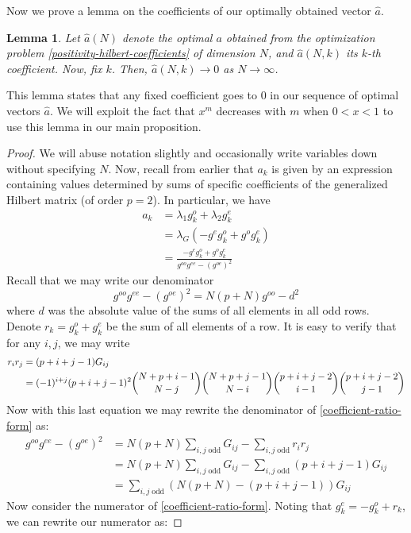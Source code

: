\documentclass{article}
\newtheorem{lem}[thm]{Lemma}
\theoremstyle{definition}
\theoremstyle{remark}
\numberwithin{equation}{section}
\begin{document}
Now we prove a lemma on the coefficients of our optimally obtained vector $\hat{a}$.
\begin{lem}\label{coefficients-vanish}
Let $\hat{a}(N)$ denote the optimal $a$ obtained from the optimization problem \ref{positivity-hilbert-coefficients} of dimension $N$, and $\hat{a}(N,k)$ its $k$-th coefficient. Now, fix $k$. Then, $\hat{a}(N,k) \to 0$ as $N\to \infty$.
\end{lem}
This lemma states that any fixed coefficient goes to 0 in our sequence of optimal vectors $\hat{a}$. We will exploit the fact that $x^m$ decreases with $m$ when $0<x<1$ to use this lemma in our main proposition. 
\begin{proof}
We will abuse notation slightly and occasionally write variables down without specifying $N$. Now, recall from earlier that $a_k$ is given by an expression containing values determined by sums of specific coefficients of the generalized Hilbert matrix (of order $p=2$). In particular, we have 
\begin{align}
a_{k} &= \lambda_1 g_k^o + \lambda_2g^e_k \\
&= \lambda_G(-g^eg_k^o + g^og_k^e) \\
&= \frac{-g^eg_k^o + g^og_k^e}{g^{oo} g^{ee}-(g^{oe})^2}\label{coefficient-ratio-form}
\end{align}
Recall that we may write our denominator
\[g^{oo} g^{ee}-(g^{oe})^2 = N(p+N)g^{oo} - d^2 \]
where $d$ was the absolute value of the sums of all elements in all odd rows. Denote $r_k = g_k^o + g_k^e$ be the sum of all elements of a row. It is easy to verify that for any $i,j$, we may write
\begin{align*}
r_ir_j &= (p+i+j-1) G_{ij} \\
&= (-1)^{i+j}(p+i+j-1)^2 \dbinom{N+p+i-1}{N-j} \dbinom{N+p+j-1}{N-i} \dbinom{p+i+j-2}{i-1} \dbinom{p+i+j-2}{j-1}
\end{align*}
Now with this last equation we may rewrite the denominator of \ref{coefficient-ratio-form} as:
\begin{align*}
g^{oo} g^{ee}-(g^{oe})^2 &= N(p+N) \sum_{i,j \; \text{odd}} G_{ij} - \sum_{i,j \; \text{odd}} r_ir_j \\
&= N(p+N) \sum_{i,j \; \text{odd}} G_{ij} - \sum_{i,j \; \text{odd}} (p+i+j-1) G_{ij}\\
&= \sum_{i,j \; \text{odd}}  (N(p+N) -(p+i+j-1))G_{ij}
\end{align*}
Now consider the numerator of  \ref{coefficient-ratio-form}. Noting that $g_k^e = -g_k^o + r_k$, we can rewrite our numerator as: 

\end{proof}
\end{document}
